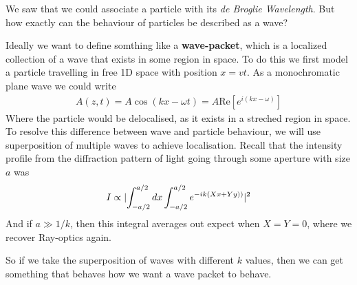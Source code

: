 We saw that we could associate a particle with its \emph{de Broglie Wavelength}. But how exactly can the behaviour of particles be described as a wave?

Ideally we want to define somthing like a \textbf{wave-packet}, which is a localized collection of a wave that exists in some region in space. 
To do this we first model a particle travelling in free 1D space with position $x = vt$. As a monochromatic plane wave we could write
\begin{align*}
	A(z,t) = A \cos(kx - \omega t) = A \text{Re}[e^{i(kx- \omega)}]
\end{align*}
Where the particle would be delocalised, as it exists in a streched region in space.
To resolve this difference between wave and particle behaviour, we will use superposition of multiple waves to achieve localisation.
Recall that the intensity profile from the diffraction pattern of light going through some aperture with size $a$ was
\begin{align*}
	I \propto \abs{\int_{-a/2}^{a/2}dx \int_{-a/2}^{a/2}e^{-ik(Xx + Yy))}}^2
\end{align*}
And if $a \gg 1/k$, then this integral averages out expect when $X=Y=0$, where we recover Ray-optics again.

So if we take the superposition of waves with different $k$ values, then we can get something that behaves how we want a wave packet to behave.

